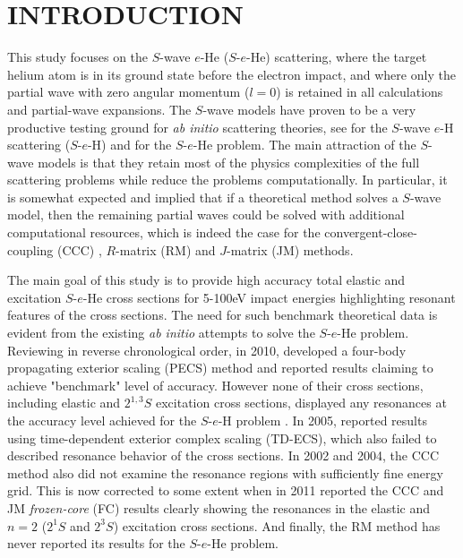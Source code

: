\documentclass[aip
, pra
, showpacs
, aps
, twocolumn
, groupedaddress
, floatfix
]{revtex4}
\begin{document}
\section{INTRODUCTION}


This study focuses on the $S$-wave $e$-He ($S$-$e$-He) scattering,
where the target helium atom is in its ground state before the electron impact,
and where only the partial wave with zero angular momentum ($l=0$) is retained in all calculations
and partial-wave expansions.
The $S$-wave models have proven to be a very productive testing ground for {\it ab initio} scattering theories,
see \cite{T62,HY74p1209,P78,P80,P81,CO84,BS92p53,BST93,KM94pL407,IDHF95,PS96,JS02,JS00l,BRIM99,S99l,MHR02,BS04,Frapiccini10} for the $S$-wave $e$-H scattering ($S$-$e$-H)
and \cite{DHIF94,PMR99,PBFS02,PNBFS04,HMR05R,HMR05,BS10p022715,BS10p022716,KFB11} for  the $S$-$e$-He problem.
The main attraction of the $S$-wave models is that they retain most of the physics complexities of the full
scattering problems while reduce the problems computationally.
In particular, it is somewhat expected and implied that if a theoretical method solves a $S$-wave model, then
the remaining partial waves could be solved with additional computational resources,
which is indeed the case for the convergent-close-coupling (CCC) \cite{FB95},
$R$-matrix (RM) \cite{FLRS94b, SMC2006} and $J$-matrix (JM) \cite{KM94pL741,KM95pL139} methods.


The main goal of this study is to provide high accuracy total elastic and excitation $S$-$e$-He cross sections for 5-100eV impact energies highlighting resonant features of the cross sections.
The need for such benchmark theoretical data is evident from the existing {\em ab initio} attempts to solve the $S$-$e$-He problem.
Reviewing in reverse chronological order, in 2010, \citet{BS10p022715} developed a four-body propagating exterior scaling (PECS) method and reported results claiming to achieve "benchmark" level of accuracy.
However none of their cross sections, including elastic and $2^{1,3}S$ excitation cross sections, displayed any resonances at the accuracy level achieved for the $S$-$e$-H problem \cite{P78}.
In 2005, \citet{HMR05} reported results using
time-dependent exterior complex scaling (TD-ECS), which also failed to described resonance behavior of the cross sections.
In 2002 and 2004, the CCC method \cite{PBFS02,PNBFS04} also did not examine the resonance regions with sufficiently fine energy grid.
This is now corrected to some extent when in 2011 \citet{KFB11} reported the CCC and JM {\em frozen-core}
(FC) results clearly showing the resonances in the elastic and $n=2$ ($2^1S$ and $2^3S$) excitation cross sections.
And finally, the RM method \cite{FLRS94b, SMC2006} has never reported its results for the $S$-$e$-He problem.
\end{document}
